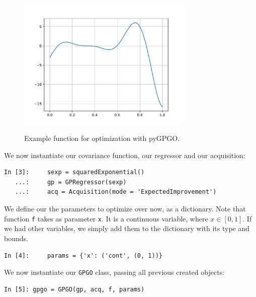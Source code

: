 \documentclass[10pt,a4paper,twoside]{book}
\begin{document}
\begin{figure}
\centering
\caption{Example function for optimization with pyGPGO.}
\includegraphics[width=0.75\textwidth]{figures/chapter5/exfun}
\label{fig:exfun}
\end{figure}


We now instantiate our covariance function, our regressor and our acquisition:

\begin{verbatim}
In [3]:     sexp = squaredExponential()
   ...:     gp = GPRegressor(sexp)
   ...:     acq = Acquisition(mode = 'ExpectedImprovement')
\end{verbatim}

We define our the parameters to optimize over now, as a dictionary. Note that function \texttt{f} takes as parameter \texttt{x}. It is a continuous variable, where $x\in \left[0, 1\right]$. If we had other variables, we simply add them to the dictionary with its type and bounds.

\begin{verbatim}
In [4]:     params = {'x': ('cont', (0, 1))}
\end{verbatim}

We now instantiate our \texttt{GPGO} class, passing all previous created objects:

\begin{verbatim}
In [5]:	gpgo = GPGO(gp, acq, f, params)
\end{verbatim}
\end{document}
